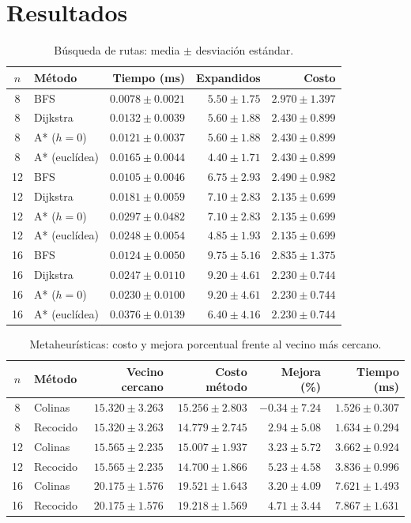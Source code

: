 \documentclass[10pt,spanish]{article}
\begin{document}
\section{Resultados}
\begin{table}[H]
\centering
\caption{Búsqueda de rutas: media $\pm$ desviación estándar.}
\small
\begin{tabular}{clrrr}
\toprule
$n$ & Método & Tiempo (ms) & Expandidos & Costo \\
\midrule
8  & BFS & $0.0078\pm0.0021$ & $5.50\pm1.75$ & $2.970\pm1.397$ \\
8  & Dijkstra & $0.0132\pm0.0039$ & $5.60\pm1.88$ & $2.430\pm0.899$ \\
8  & A* ($h=0$) & $0.0121\pm0.0037$ & $5.60\pm1.88$ & $2.430\pm0.899$ \\
8  & A* (euclídea) & $0.0165\pm0.0044$ & $4.40\pm1.71$ & $2.430\pm0.899$ \\
\midrule
12 & BFS & $0.0105\pm0.0046$ & $6.75\pm2.93$ & $2.490\pm0.982$ \\
12 & Dijkstra & $0.0181\pm0.0059$ & $7.10\pm2.83$ & $2.135\pm0.699$ \\
12 & A* ($h=0$) & $0.0297\pm0.0482$ & $7.10\pm2.83$ & $2.135\pm0.699$ \\
12 & A* (euclídea) & $0.0248\pm0.0054$ & $4.85\pm1.93$ & $2.135\pm0.699$ \\
\midrule
16 & BFS & $0.0124\pm0.0050$ & $9.75\pm5.16$ & $2.835\pm1.375$ \\
16 & Dijkstra & $0.0247\pm0.0110$ & $9.20\pm4.61$ & $2.230\pm0.744$ \\
16 & A* ($h=0$) & $0.0230\pm0.0100$ & $9.20\pm4.61$ & $2.230\pm0.744$ \\
16 & A* (euclídea) & $0.0376\pm0.0139$ & $6.40\pm4.16$ & $2.230\pm0.744$ \\
\bottomrule
\end{tabular}
\end{table}

\begin{table}[H]
\centering
\caption{Metaheurísticas: costo y mejora porcentual frente al vecino más cercano.}
\small
\begin{tabular}{clrrrr}
\toprule
$n$ & Método & Vecino cercano & Costo método & Mejora (\%) & Tiempo (ms) \\
\midrule
8 & Colinas & $15.320\pm3.263$ & $15.256\pm2.803$ & $-0.34\pm7.24$ & $1.526\pm0.307$ \\
8 & Recocido & $15.320\pm3.263$ & $14.779\pm2.745$ & $2.94\pm5.08$ & $1.634\pm0.294$ \\
12 & Colinas & $15.565\pm2.235$ & $15.007\pm1.937$ & $3.23\pm5.72$ & $3.662\pm0.924$ \\
12 & Recocido & $15.565\pm2.235$ & $14.700\pm1.866$ & $5.23\pm4.58$ & $3.836\pm0.996$ \\
16 & Colinas & $20.175\pm1.576$ & $19.521\pm1.643$ & $3.20\pm4.09$ & $7.621\pm1.493$ \\
16 & Recocido & $20.175\pm1.576$ & $19.218\pm1.569$ & $4.71\pm3.44$ & $7.867\pm1.631$ \\
\bottomrule
\end{tabular}
\end{table}
\end{document}
